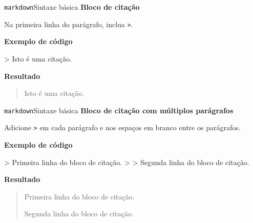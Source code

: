 \documentclass[
  10pt,
  ignorenonframetext,
]{beamer}
\newenvironment{Shaded}{\begin{snugshade}}{\end{snugshade}}
\newcommand{\AttributeTok}[1]{\textcolor[rgb]{0.40,0.45,0.13}{#1}}
\begin{document}
\begin{frame}[fragile]{\texttt{markdown}\newline Sintaxe básica}
\protect\hypertarget{markdownsintaxe-buxe1sica-4}{}
\textbf{Bloco de citação}

Na primeira linha do parágrafo, inclua \texttt{\textgreater{}}.

\textbf{Exemplo de código}

\begin{Shaded}
\begin{Highlighting}[]
\AttributeTok{\textgreater{} Isto é uma citação.}
\end{Highlighting}
\end{Shaded}

\textbf{Resultado}

\hfill\break

\begin{quote}
Isto é uma citação.
\end{quote}
\end{frame}

\begin{frame}[fragile]{\texttt{markdown}\newline Sintaxe básica}
\protect\hypertarget{markdownsintaxe-buxe1sica-5}{}
\textbf{Bloco de citação com múltiplos parágrafos}

Adicione \texttt{\textgreater{}} em cada parágrafo e nos espaços em
branco entre os parágrafos.

\textbf{Exemplo de código}

\begin{Shaded}
\begin{Highlighting}[]
\AttributeTok{\textgreater{} Primeira linha do bloco de citação.}
\AttributeTok{\textgreater{}}
\AttributeTok{\textgreater{} Segunda linha do bloco de citação.}
\end{Highlighting}
\end{Shaded}

\textbf{Resultado}

\hfill\break

\begin{quote}
Primeira linha do bloco de citação.

Segunda linha do bloco de citação.
\end{quote}
\end{frame}
\end{document}
